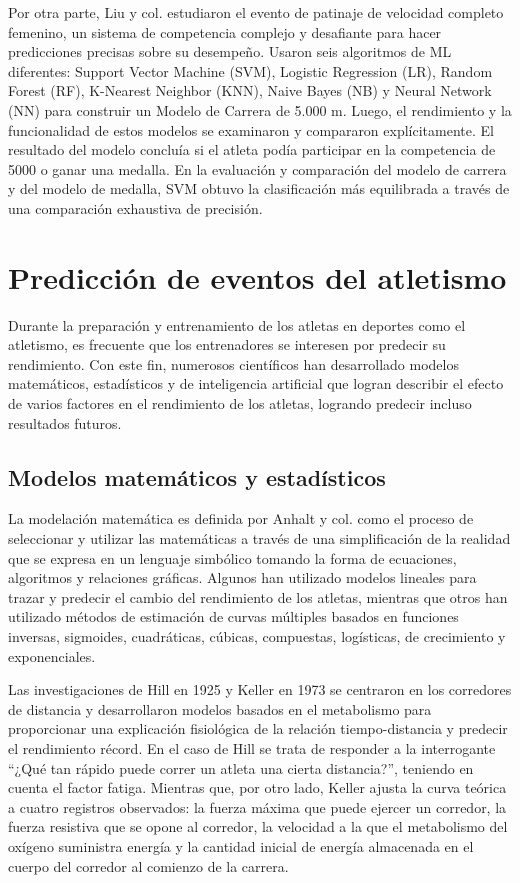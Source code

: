Por otra parte, Liu y col. \cite{liu2022construction} estudiaron el evento de patinaje de velocidad completo femenino, un sistema de competencia complejo y desafiante para hacer predicciones precisas sobre su desempeño. Usaron seis algoritmos de ML diferentes: Support Vector Machine (SVM), Logistic Regression (LR), Random Forest (RF), K-Nearest Neighbor (KNN), Naive Bayes (NB) y Neural Network (NN) para construir un Modelo de Carrera de 5.000 m. Luego, el rendimiento y la funcionalidad de estos modelos se examinaron y compararon explícitamente. El resultado del modelo concluía si el atleta podía participar en la competencia de 5000 o ganar una medalla. En la evaluación y comparación del modelo de carrera y del modelo de medalla, SVM obtuvo la clasificación más equilibrada a través de una comparación exhaustiva de precisión.

\section{Predicción de eventos del atletismo}

Durante la preparación y entrenamiento de los atletas en deportes como el atletismo, es frecuente que los entrenadores se interesen por predecir su rendimiento. Con este fin, numerosos científicos han desarrollado modelos matemáticos, estadísticos y de inteligencia artificial que logran describir el efecto de varios factores en el rendimiento de los atletas, logrando predecir incluso resultados futuros. 

\subsection{Modelos matemáticos y estadísticos}

La modelación matemática es definida por Anhalt y col. \cite{anhalt2018mathematical} como el proceso de seleccionar y utilizar las matemáticas a través de una simplificación de la realidad que se expresa en un lenguaje simbólico tomando la forma de ecuaciones, algoritmos y relaciones gráficas. Algunos han utilizado modelos lineales para trazar y predecir el cambio del rendimiento de los atletas, mientras que otros han utilizado métodos de estimación de curvas múltiples basados en funciones inversas, sigmoides, cuadráticas, cúbicas, compuestas, logísticas, de crecimiento y exponenciales.

Las investigaciones de Hill en 1925 \cite{hill1925physiological} y Keller en 1973 \cite{keller1973theory} se centraron en los corredores de distancia y desarrollaron modelos basados en el metabolismo para proporcionar una explicación fisiológica de la relación tiempo-distancia y predecir el rendimiento récord. En el caso de Hill se trata de responder a la interrogante “¿Qué tan rápido puede correr un atleta una cierta distancia?”, teniendo en cuenta el factor fatiga. Mientras que, por otro lado, Keller ajusta la curva teórica a cuatro registros observados: la fuerza máxima que puede ejercer un corredor, la fuerza resistiva que se opone al corredor, la velocidad a la que el metabolismo del oxígeno suministra energía y la cantidad inicial de energía almacenada en el cuerpo del corredor al comienzo de la carrera. 

